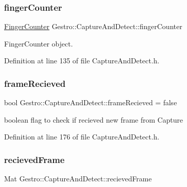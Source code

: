 \subsubsection{\texorpdfstring{finger\+Counter}{fingerCounter}}
{\footnotesize\ttfamily \hyperlink{class_gesture_detection_1_1_finger_counter}{Finger\+Counter} Gestro\+::\+Capture\+And\+Detect\+::finger\+Counter\hspace{0.3cm}{\ttfamily [private]}}



Finger\+Counter object. 



Definition at line 135 of file Capture\+And\+Detect.\+h.

\mbox{\label{class_gestro_1_1_capture_and_detect_a6ff36cce05c030ceda69abd88e557d88}} 
\subsubsection{\texorpdfstring{frame\+Recieved}{frameRecieved}}
{\footnotesize\ttfamily bool Gestro\+::\+Capture\+And\+Detect\+::frame\+Recieved = false\hspace{0.3cm}{\ttfamily [private]}}



boolean flag to check if recieved new frame from Capture 



Definition at line 176 of file Capture\+And\+Detect.\+h.

\mbox{\label{class_gestro_1_1_capture_and_detect_a5bd3dee8a4b9bffe627b1475a84da4e8}} 
\subsubsection{\texorpdfstring{recieved\+Frame}{recievedFrame}}
{\footnotesize\ttfamily Mat Gestro\+::\+Capture\+And\+Detect\+::recieved\+Frame}



